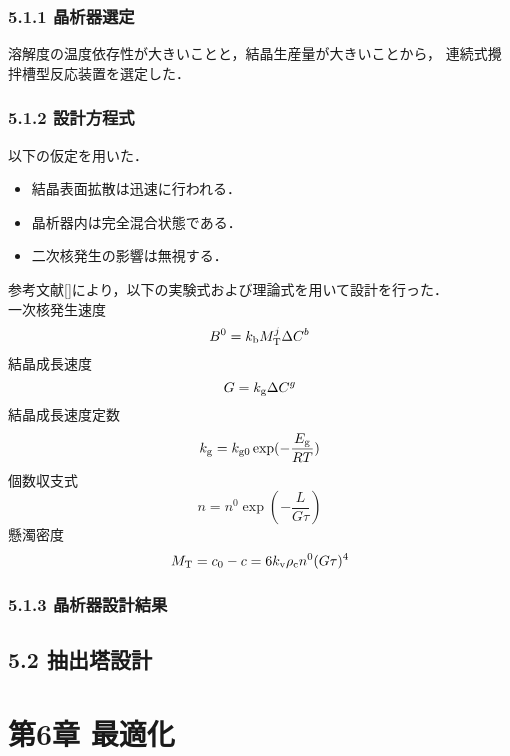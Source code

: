 \documentclass[platex, a4j]{jsarticle}
\begin{document}
\subsection*{5.1.1 晶析器選定}
溶解度の温度依存性が大きいことと，結晶生産量が大きいことから，
連続式攪拌槽型反応装置を選定した．
\subsection*{5.1.2 設計方程式}
以下の仮定を用いた．
\begin{itemize}
    \item 結晶表面拡散は迅速に行われる．\\
    \item 晶析器内は完全混合状態である．\\
    \item 二次核発生の影響は無視する．\\
\end{itemize}

参考文献[]により，以下の実験式および理論式を用いて設計を行った．\\
一次核発生速度
\begin{equation}
    B^0 = k_{{\rm b}}M_{{\rm T}}^j \Delta C^b
\end{equation}
結晶成長速度
\begin{equation}
    G = k_{{\rm g}}\Delta C^g
\end{equation}
結晶成長速度定数
\begin{equation}
    k_{{\rm g}} = k_{{\rm g0}} \exp(-\frac{E_{{\rm g}}}{RT})
\end{equation}
個数収支式
\begin{equation}
    n=n^0 \exp(-\frac{L}{G\tau})
\end{equation}
懸濁密度
\begin{equation}
    M_{{\rm T}} = c_0-c = 6k_{{\rm v}}\rho_{{\rm c}}n^0(G\tau)^4
\end{equation}

\subsection*{5.1.3 晶析器設計結果}


\section*{5.2 抽出塔設計}

\chapter*{第6章 最適化}
\end{document}
